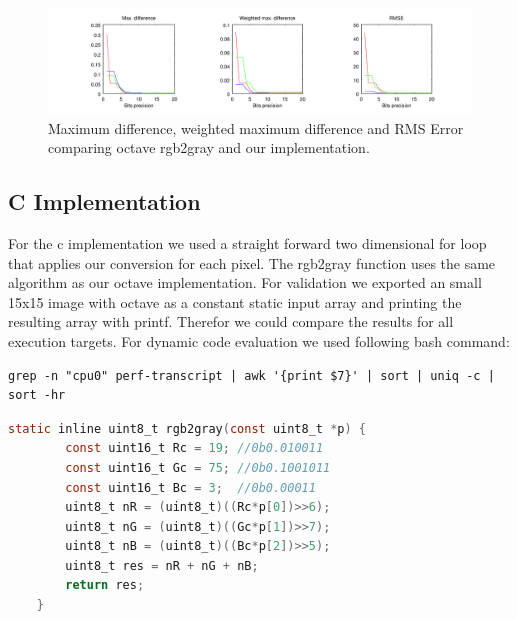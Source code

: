 \documentclass[a4paper]{scrartcl}
\begin{document}
\begin{figure}[h]
  \centering
  \includegraphics[width=\textwidth]{gray_error} 
  \caption{Maximum difference, weighted maximum difference and RMS Error comparing octave rgb2gray and our implementation.}
\end{figure}


\subsection{C Implementation}

For the c implementation we used a straight forward two dimensional for loop that applies our conversion for each pixel. The rgb2gray function uses the same algorithm as our octave implementation. For validation we exported an small 15x15 image with octave as a constant static input array and printing the resulting array with printf. Therefor we could compare the results for all execution targets. For dynamic code evaluation we used following bash command:

\begin{lstlisting}
grep -n "cpu0" perf-transcript | awk '{print $7}' | sort | uniq -c | sort -hr
\end{lstlisting}

\begin{minipage}{\linewidth}
	\begin{lstlisting}[language=C]
	static inline uint8_t rgb2gray(const uint8_t *p) {
		const uint16_t Rc = 19; //0b0.010011
		const uint16_t Gc = 75; //0b0.1001011
		const uint16_t Bc = 3;  //0b0.00011
		uint8_t nR = (uint8_t)((Rc*p[0])>>6);
		uint8_t nG = (uint8_t)((Gc*p[1])>>7);
		uint8_t nB = (uint8_t)((Bc*p[2])>>5);
		uint8_t res = nR + nG + nB;
		return res;
	}
	\end{lstlisting}
\end{minipage}
\end{document}
